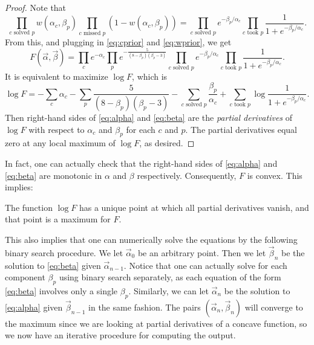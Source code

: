 \begin{proof}
	Note that
	\[
		\prod_{\text{$c$ solved $p$}} w(\alpha_c, \beta_p)
		\prod_{\text{$c$ missed $p$}} (1-w(\alpha_c, \beta_p))
		=
		\prod_{\text{$c$ solved $p$}} e^{-\beta_p/\alpha_c}
		\prod_{\text{$c$ took $p$}} \frac{1}{1+e^{-\beta_p/\alpha_c}}.
	\]
	From this, and plugging in \eqref{eq:cprior} and \eqref{eq:wprior}, we get
	\[
		F(\vec\alpha, \vec\beta)
		= \prod_{c} e^{-\alpha_c}
		\prod_{p} e^{-\frac{5}{(8-\beta_p)(\beta_p-3)}}
		\prod_{\text{$c$ solved $p$}} e^{-\beta_p/\alpha_c}
		\prod_{\text{$c$ took $p$}} \frac{1}{1+e^{-\beta_p/\alpha_c}}.
	\]
	It is equivalent to maximize $\log F$, which is
	\[
		\log F
		= -\sum_{c} \alpha_c
		- \sum_{p} \frac{5}{(8-\beta_p)(\beta_p-3)}
		- \sum_{\text{$c$ solved $p$}} \frac{\beta_p}{\alpha_c}
		+ \sum_{\text{$c$ took $p$}} \log\frac{1}{1+e^{-\beta_p/\alpha_c}}.
	\]
	Then right-hand sides of \eqref{eq:alpha} and \eqref{eq:beta}
	are the \emph{partial derivatives} of $\log F$ with respect
	to $\alpha_c$ and $\beta_p$ for each $c$ and $p$.
	The partial derivatives equal zero at any local maximum of $\log F$,
	as desired.
\end{proof}

In fact, one can actually check that the right-hand sides of 
\eqref{eq:alpha} and \eqref{eq:beta}
are monotonic in $\alpha$ and $\beta$ respectively.
Consequently, $F$ is convex.
This implies:
\begin{proposition}
	The function $\log F$ has a unique point at which all partial
	derivatives vanish, and that point is a maximum for $F$.
\end{proposition}

This also implies that one can numerically solve the equations
by the following binary search procedure.
We let $\vec\alpha_0$ be an arbitrary point.
Then we let $\vec\beta_n$ be the solution to \eqref{eq:beta} given $\vec\alpha_{n-1}$.
Notice that one can actually solve for each component $\beta_p$
using binary search separately,
as each equation of the form \eqref{eq:beta} involves only a single $\beta_p$.
Similarly, we can let $\vec\alpha_n$ be the solution to \eqref{eq:alpha}
given $\vec\beta_{n-1}$ in the same fashion.
The pairs $(\vec\alpha_n, \vec\beta_n)$ will converge to the maximum
since we are looking at partial derivatives of a concave function,
so we now have an iterative procedure for computing the output.
